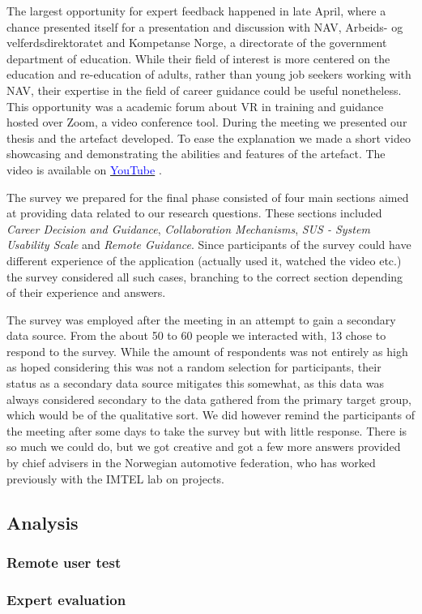 The largest opportunity for expert feedback happened in late April, where a chance presented itself for a presentation and discussion with NAV, Arbeids- og velferdsdirektoratet and Kompetanse Norge, a directorate of the government department of education. While their field of interest is more centered on the education and re-education of adults, rather than young job seekers working with NAV, their expertise in the field of career guidance could be useful nonetheless.
This opportunity was a academic forum about VR in training and guidance hosted over Zoom, a video conference tool. During the meeting we presented our thesis and the artefact developed. To ease the explanation we made a short video showcasing and demonstrating the abilities and features of the artefact. The video is available on  \href{https://www.youtube.com/watch?v=ZNnK4ohWSag}{\textcolor{blue}{YouTube}} . 

The survey we prepared for the final phase consisted of four main sections aimed at providing data related to our research questions. These sections included \textit{Career Decision and Guidance}, \textit{Collaboration Mechanisms}, \textit{SUS - System Usability Scale} and \textit{Remote Guidance}. Since participants of the survey could have different experience of the application (actually used it, watched the video etc.) the survey considered all such cases, branching to the correct section depending of their experience and answers. 

The survey was employed after the meeting in an attempt to gain a secondary data source. From the about 50 to 60 people we interacted with, 13 chose to respond to the survey. While the amount of respondents was not entirely as high as hoped considering this was not a random selection for participants, their status as a secondary data source mitigates this somewhat, as this data was always considered secondary to the data gathered from the primary target group, which would be of the qualitative sort. We did however remind the participants of the meeting after some days to take the survey but with little response. There is so much we could do, but we got creative and got a few more answers provided by chief advisers in the Norwegian automotive federation, who has worked previously with the IMTEL lab on projects.    











\subsection{Analysis}

\subsubsection{Remote user test}


\subsubsection{Expert evaluation}


\cleardoublepage